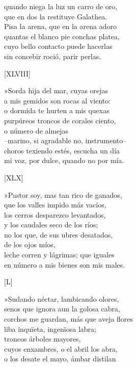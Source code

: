 \documentclass[11pt,a4paper,twoside]{article}
\begin{document}
quando niega la luz un carro de oro,\\
que en dos la restituye Galathea.\\
Pisa la arena, que en la arena adoro\\
quantas el blanco pie conchas platea,\\
cuyo bello contacto puede hacerlas\\
sin concebir roció, parir perlas.\pend 
\begin{center}
	[XLVIII]
\end{center}\pstart
»Sorda hija del mar, cuyas orejas\\
a mis gemidos son rocas al viento:\\
o dormida te hurten a mis quexas\\
purpúreos troncos de corales ciento,\\
o  número de almejas\\
--marino, si agradable no, instrumento--\\
choros texiendo estés, escucha un día\\
mi voz, por dulce, quando no por mía.\pend
\begin{center}
	[XLX]
\end{center}\pstart
»Pastor soy, mas tan rico de ganados,\\
que los valles impido más vacíos,\\
los cerros desparezco levantados,\\
y los caudales seco de los ríos;\\
no los que, de sus ubres desatados,\\
 de los ojos míos,\\
leche corren y lágrimas; que iguales\\
en número a mis bienes son mis males.\pend
\begin{center}
	[L]
\end{center}\pstart
»Sudando néctar, lambicando olores,\\
senos que ignora aun la golosa cabra,\\
corchos me guardan, más que aveja flores\\
liba inquïeta, ingenïosa labra;\\
troncos  árboles mayores,\\
cuyos enxambres, o el abril los abra,\\
o los desate el mayo, ámbar distilan\\
\end{document}
